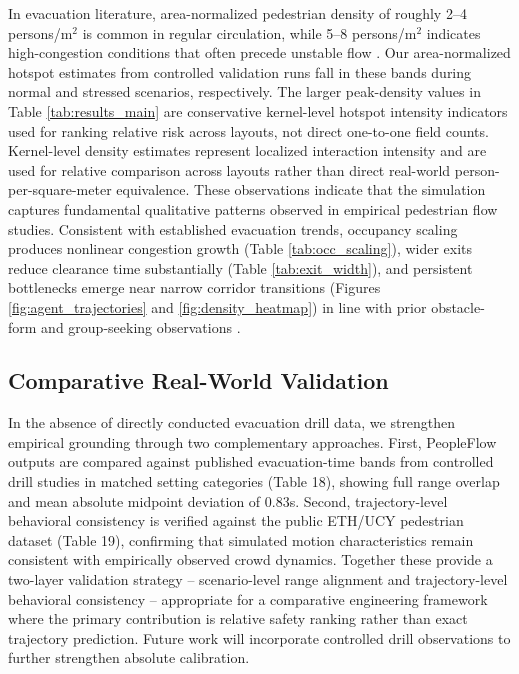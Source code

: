 \documentclass[utf8]{FrontiersinHarvard}
\begin{document}
In evacuation literature, area-normalized pedestrian density of roughly 2--4 persons/m$^2$ is common in regular circulation, while 5--8 persons/m$^2$ indicates high-congestion conditions that often precede unstable flow \cite{fruin,crowd_book,haghani2020}. Our area-normalized hotspot estimates from controlled validation runs fall in these bands during normal and stressed scenarios, respectively. The larger peak-density values in Table \ref{tab:results_main} are conservative kernel-level hotspot intensity indicators used for ranking relative risk across layouts, not direct one-to-one field counts. Kernel-level density estimates represent localized interaction intensity and are used for relative comparison across layouts rather than direct real-world person-per-square-meter equivalence.
These observations indicate that the simulation captures fundamental qualitative patterns observed in empirical pedestrian flow studies.
Consistent with established evacuation trends, occupancy scaling produces nonlinear congestion growth (Table \ref{tab:occ_scaling}), wider exits reduce clearance time substantially (Table \ref{tab:exit_width}), and persistent bottlenecks emerge near narrow corridor transitions (Figures \ref{fig:agent_trajectories} and \ref{fig:density_heatmap}) in line with prior obstacle-form and group-seeking observations \cite{yano2018obstacle,chen2021entropy}.

\subsection{Comparative Real-World Validation}
In the absence of directly conducted evacuation drill data, we strengthen empirical grounding through two complementary approaches. First, PeopleFlow outputs are compared against published evacuation-time bands from controlled drill studies in matched setting categories (Table 18), showing full range overlap and mean absolute midpoint deviation of 0.83s. Second, trajectory-level behavioral consistency is verified against the public ETH/UCY pedestrian dataset (Table 19), confirming that simulated motion characteristics remain consistent with empirically observed crowd dynamics. Together these provide a two-layer validation strategy -- scenario-level range alignment and trajectory-level behavioral consistency -- appropriate for a comparative engineering framework where the primary contribution is relative safety ranking rather than exact trajectory prediction. Future work will incorporate controlled drill observations to further strengthen absolute calibration.
\end{document}
